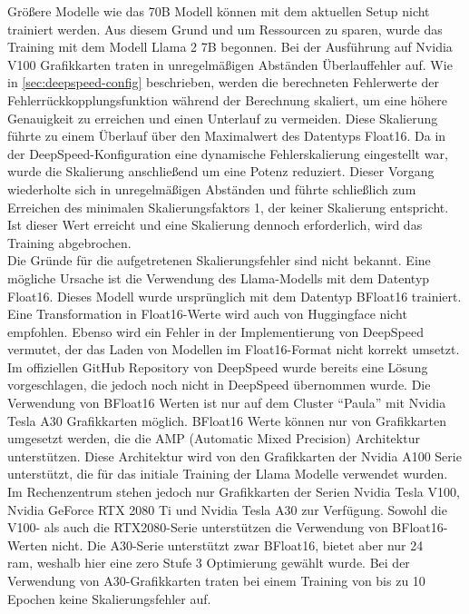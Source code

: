 Größere Modelle wie das 70B Modell können mit dem aktuellen Setup nicht trainiert werden.
Aus diesem Grund und um Ressourcen zu sparen, wurde das Training mit dem Modell Llama 2 7B begonnen.
Bei der Ausführung auf Nvidia V100 Grafikkarten traten in unregelmäßigen Abständen Überlauffehler auf.
Wie in \cref{sec:deepspeed-config} beschrieben, werden die berechneten Fehlerwerte der Fehlerrückkopplungsfunktion während der Berechnung skaliert, um eine höhere Genauigkeit zu erreichen und einen Unterlauf zu vermeiden.
Diese Skalierung führte zu einem Überlauf über den Maximalwert des Datentyps Float16.
Da in der DeepSpeed-Konfiguration eine dynamische Fehlerskalierung eingestellt war, wurde die Skalierung anschließend um eine Potenz reduziert.
Dieser Vorgang wiederholte sich in unregelmäßigen Abständen und führte schließlich zum Erreichen des minimalen Skalierungsfaktors 1, der keiner Skalierung entspricht.
Ist dieser Wert erreicht und eine Skalierung dennoch erforderlich, wird das Training abgebrochen.\\

Die Gründe für die aufgetretenen Skalierungsfehler sind nicht bekannt.
Eine mögliche Ursache ist die Verwendung des Llama-Modells mit dem Datentyp Float16.
Dieses Modell wurde ursprünglich mit dem Datentyp BFloat16 trainiert.
Eine Transformation in Float16-Werte wird auch von Huggingface nicht empfohlen.
Ebenso wird ein Fehler in der Implementierung von DeepSpeed vermutet, der das Laden von Modellen im Float16-Format nicht korrekt umsetzt.
Im offiziellen GitHub Repository von DeepSpeed wurde bereits eine Lösung vorgeschlagen, die jedoch noch nicht in DeepSpeed übernommen wurde.
Die Verwendung von BFloat16 Werten ist nur auf dem Cluster \enquote{Paula} mit Nvidia Tesla A30 Grafikkarten möglich.
BFloat16 Werte können nur von Grafikkarten umgesetzt werden, die die AMP (Automatic Mixed Precision) Architektur unterstützen.
Diese Architektur wird von den Grafikkarten der Nvidia A100 Serie unterstützt, die für das initiale Training der Llama Modelle verwendet wurden.
Im Rechenzentrum stehen jedoch nur Grafikkarten der Serien Nvidia Tesla V100, Nvidia GeForce RTX 2080 Ti und Nvidia Tesla A30 zur Verfügung.
Sowohl die V100- als auch die RTX2080-Serie unterstützen die Verwendung von BFloat16-Werten nicht.
Die A30-Serie unterstützt zwar BFloat16, bietet aber nur \SI{24}{\giga\byte} \ac{ram}, weshalb hier eine \ac{zero} Stufe 3 Optimierung gewählt wurde.
Bei der Verwendung von A30-Grafikkarten traten bei einem Training von bis zu 10 Epochen keine Skalierungsfehler auf.\\

